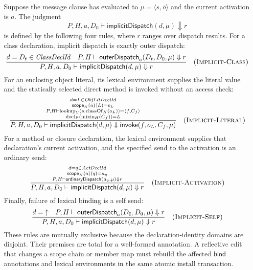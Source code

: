 \documentclass[11pt]{article}
\numberwithin{equation}{section}
\newcommand{\kw}[1]{\ensuremath{\mathsf{#1}}}
\newcommand{\undef}{\mathord{\uparrow}}
\newcommand{\classof}{\mathop{\mathrm{classOf}}}
\newcommand{\mixin}{\mathop{\mathrm{mixin}}}
\newcommand{\decl}{\mathop{\mathrm{decl}}}
\newcommand{\lookup}{\mathop{\mathrm{lookup}}}
\newcommand{\rulelabel}[1]{\textsc{#1}}
\begin{document}
Suppose the message clause has evaluated to $\mu=\langle s,\bar o\rangle$ and
the current activation is $a$.  The judgment
\begin{equation}\label{eq:implicit-judgment}
 P,H,a,D_0\vdash\mathsf{implicitDispatch}(d,\mu)\Downarrow r
\end{equation}
is defined by the following four rules, where $r$ ranges over dispatch results.
For a class declaration, implicit dispatch is exactly outer dispatch:
\[
\dfrac{d=D_t\in\mathit{ClassDeclId}\quad
       P,H\vdash\mathsf{outerDispatch}_a(D_t,D_0,\mu)\Downarrow r}
      {P,H,a,D_0\vdash\mathsf{implicitDispatch}(d,\mu)\Downarrow r}
\quad(\rulelabel{Implicit-Class})
\]
For an enclosing object literal, its lexical environment supplies the literal
value and the statically selected direct method is invoked without an access
check:
\[
\dfrac{\substack{d=L\in\mathit{ObjLitDeclId}\\
       \mathsf{scope}_H(a)(L)=o_L\\
       P,H\vdash\lookup_U(s,\classof_H(o_L))=\langle f,C_f\rangle\\
       \decl_P(\mixin_H(C_f))=L}}
      {P,H,a,D_0\vdash\mathsf{implicitDispatch}(d,\mu)
       \Downarrow\kw{invoke}(f,o_L,C_f,\mu)}
\quad(\rulelabel{Implicit-Literal})
\]
For a method or closure declaration, the lexical environment supplies that
declaration's current activation, and the specified send to the activation is
an ordinary send:
\[
\dfrac{\substack{d=q\in\mathit{ActDeclId}\\
       \mathsf{scope}_H(a)(q)=a_q\\
       P,H\vdash\mathsf{ordinaryDispatch}(a_q,\mu)\Downarrow r}}
      {P,H,a,D_0\vdash\mathsf{implicitDispatch}(d,\mu)\Downarrow r}
\quad(\rulelabel{Implicit-Activation})
\]
Finally, failure of lexical binding is a self send:
\[
\dfrac{d=\undef\quad
       P,H\vdash\mathsf{outerDispatch}_a(D_0,D_0,\mu)\Downarrow r}
      {P,H,a,D_0\vdash\mathsf{implicitDispatch}(d,\mu)\Downarrow r}
\quad(\rulelabel{Implicit-Self})
\]
These rules are mutually exclusive because the declaration-identity domains
are disjoint.  Their premises are total for a well-formed annotation.  A
reflective edit that changes a scope chain or member map must rebuild the
affected $\mathsf{bind}$ annotations and lexical environments in the same
atomic install transaction.
\end{document}
